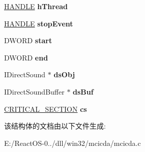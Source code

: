 \begin{DoxyCompactItemize}
\hyperlink{interfacevoid}{H\+A\+N\+D\+LE} {\bfseries h\+Thread}
\item 
\mbox{\label{struct_w_i_n_e___m_c_i_c_d_a_u_d_i_o_a91c775cce44576887f99477dc557424d}} 
\hyperlink{interfacevoid}{H\+A\+N\+D\+LE} {\bfseries stop\+Event}
\item 
\mbox{\label{struct_w_i_n_e___m_c_i_c_d_a_u_d_i_o_a2b2152477316e2e4482570ed84ca52fd}} 
D\+W\+O\+RD {\bfseries start}
\item 
\mbox{\label{struct_w_i_n_e___m_c_i_c_d_a_u_d_i_o_a272a794ad2d4c470dd780e60a7463dfa}} 
D\+W\+O\+RD {\bfseries end}
\item 
\mbox{\label{struct_w_i_n_e___m_c_i_c_d_a_u_d_i_o_a213c268dc20abadf17ee1a16406666ef}} 
I\+Direct\+Sound $\ast$ {\bfseries ds\+Obj}
\item 
\mbox{\label{struct_w_i_n_e___m_c_i_c_d_a_u_d_i_o_ad542378f7a880d491237fc7eae284f33}} 
I\+Direct\+Sound\+Buffer $\ast$ {\bfseries ds\+Buf}
\item 
\mbox{\label{struct_w_i_n_e___m_c_i_c_d_a_u_d_i_o_a627628d4cc0d82159a56f7b1b8809d8d}} 
\hyperlink{struct___c_r_i_t_i_c_a_l___s_e_c_t_i_o_n}{C\+R\+I\+T\+I\+C\+A\+L\+\_\+\+S\+E\+C\+T\+I\+ON} {\bfseries cs}
\end{DoxyCompactItemize}


该结构体的文档由以下文件生成\+:\begin{DoxyCompactItemize}
\item 
E\+:/\+React\+O\+S-\/0../dll/win32/mcicda/mcicda.\+c\end{DoxyCompactItemize}
